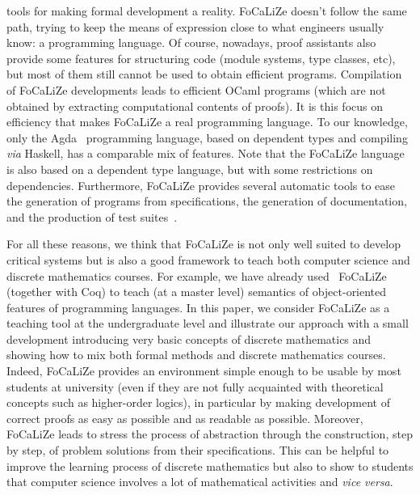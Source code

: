\documentclass[submission,copyright,creativecommons]{eptcs}
\def\focalize{FoCaLiZe \mbox{}}
\begin{document}
tools for making formal development a reality. \focalize doesn't follow
the same path, trying to keep the means of expression close to what
engineers usually know: a programming language.
Of course, nowadays, proof assistants also provide some features for
structuring code (module systems, type classes, etc), but most of them
still cannot be used
to obtain efficient programs. 
Compilation of \focalize developments leads to efficient OCaml programs
(which are not obtained by extracting computational contents of
proofs). It is this focus on efficiency that makes \focalize a real programming
language. To our knowledge, only the Agda~\cite{conf/tphol/BoveDN09}
programming language, based on dependent types and compiling {\it via}
Haskell, has a comparable mix of features.
Note that the \focalize language is also based on a
dependent type language, but with some restrictions on dependencies.
Furthermore, \focalize
provides several automatic tools to ease the generation of programs
from specifications, the generation of
documentation, and the production of
test suites~\cite{DBLP:conf/icsoft/CarlierDG10}.


For all these reasons, we think that \focalize is not only well suited
to develop critical systems but is also a good framework to teach both
computer science and discrete mathematics courses.
For example, we have already
used~\cite{Coq-Ens} \focalize (together with Coq) to teach (at a
master level) semantics of
object-oriented features of programming languages. 
In this paper, we consider \focalize as a teaching tool at the
undergraduate level and illustrate our approach with
a small development introducing very basic concepts 
of discrete mathematics and showing
how to mix both formal
methods and discrete mathematics courses.
Indeed,  \focalize provides
an environment simple enough to be 
usable by most students at university (even if they are not fully
acquainted with theoretical concepts such as 
higher-order logics), in particular by making development
of correct proofs as easy as possible and as readable  as possible.
Moreover, \focalize leads to stress the process of
abstraction through the construction, step by step, of problem
solutions from their specifications. This can be helpful
to improve the learning process of discrete mathematics but also to
show to students that
computer
science involves a lot of mathematical activities and {\it vice versa}.
\end{document}
